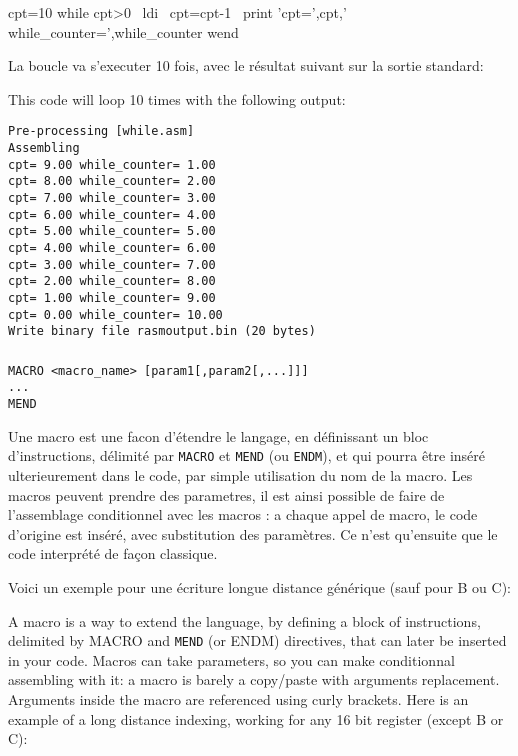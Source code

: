 \begin{code}
cpt=10
while cpt\textgreater 0
\ ldi
\ cpt=cpt-1
\ print 'cpt=',cpt,' while\_counter=',while\_counter
wend
\end{code}

\begin{xfr}
La boucle va s'executer 10 fois, avec le résultat suivant sur la sortie standard:
\end{xfr}

\begin{xen}
This code will loop 10 times with the following output:
\end{xen}

\begin{verbatim}
Pre-processing [while.asm]
Assembling
cpt= 9.00 while_counter= 1.00
cpt= 8.00 while_counter= 2.00
cpt= 7.00 while_counter= 3.00
cpt= 6.00 while_counter= 4.00
cpt= 5.00 while_counter= 5.00
cpt= 4.00 while_counter= 6.00
cpt= 3.00 while_counter= 7.00
cpt= 2.00 while_counter= 8.00
cpt= 1.00 while_counter= 9.00
cpt= 0.00 while_counter= 10.00
Write binary file rasmoutput.bin (20 bytes)
\end{verbatim}

\subsubsection{}\label{MACRO}
\begin{verbatim}
MACRO <macro_name> [param1[,param2[,...]]]
...
MEND
\end{verbatim}

\begin{xfr}
Une macro est une facon d'étendre le langage, en définissant un bloc d'instructions, délimité par \texttt{MACRO} et \texttt{MEND} (ou \texttt{ENDM}), et qui pourra être inséré ulterieurement dans le code, par simple utilisation du nom de la macro.
Les macros peuvent prendre des parametres, il est ainsi possible de faire de l'assemblage conditionnel avec les macros : a  chaque appel de macro, le code d'origine est inséré, avec substitution des paramètres. Ce n'est qu'ensuite que le code interprété de façon classique.

Voici un exemple pour une écriture longue distance générique (sauf pour B ou C):

\end{xfr}

\begin{xen}
A macro is a way to extend the language, by defining a block of instructions, delimited by MACRO and \texttt{MEND} (or ENDM) directives, that can later be inserted in your code.
Macros can take parameters, so you can make conditionnal assembling with it: a macro is barely a copy/paste with arguments replacement. Arguments inside the macro are referenced using curly brackets. Here is an example of a long distance indexing, working for any 16 bit register (except B or C):
\end{xen}

